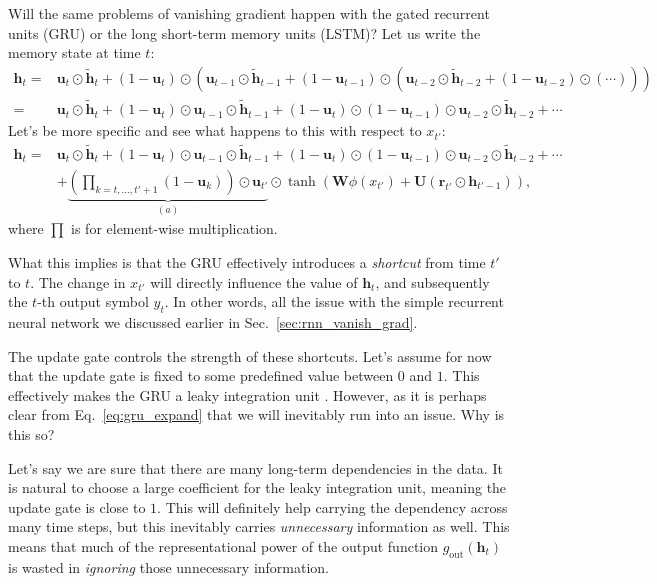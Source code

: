\documentclass{report}
\newcommand{\vect}[1]{\mathbf{#1}}
\newcommand{\matr}[1]{\mathbf{#1}}
\newcommand{\vh}[0]{\vect{h}}
\newcommand{\vu}[0]{\vect{u}}
\newcommand{\vr}[0]{\vect{r}}
\newcommand{\mW}[0]{\matr{W}}
\newcommand{\mU}[0]{\matr{U}}
\begin{document}
Will the same problems of vanishing gradient happen with the gated recurrent
units (GRU) or the long short-term memory units (LSTM)? Let us write the memory 
state at time $t$:
\begin{align*}
    \vh_t =& \vu_t \odot \tilde{\vh}_t + 
    (1 - \vu_t) \odot \left(
        \vu_{t-1} \odot \tilde{\vh}_{t-1} + 
        (1 - \vu_{t-1}) \odot \left(
            \vu_{t-2} \odot \tilde{\vh}_{t-2} + 
            (1 - \vu_{t-2}) \odot \left(
                \cdots
            \right)
        \right)
    \right) 
    \\
    =& \vu_t \odot \tilde{\vh}_t +
    (1-\vu_t) \odot \vu_{t-1} \odot \tilde{\vh}_{t-1} +
    (1-\vu_t) \odot (1-\vu_{t-1}) \odot \vu_{t-2} \odot \tilde{\vh}_{t-2} +
    \cdots
\end{align*}
Let's be more specific and see what happens to this with respect to $x_{t'}$:
\begin{align}
    \vh_t =& \vu_t \odot \tilde{\vh}_t +
    (1-\vu_t) \odot \vu_{t-1} \odot \tilde{\vh}_{t-1} +
    (1-\vu_t) \odot (1-\vu_{t-1}) \odot \vu_{t-2} \odot \tilde{\vh}_{t-2} +
    \cdots 
    \nonumber \\
    \label{eq:gru_expand}
    & +
    \underbrace{
        \left(\prod_{k=t,\ldots,t'+1} (1-\vu_k)\right) \odot \vu_{t'} 
    }_{(a)}
    \odot \tanh \left( \mW \phi(x_{t'}) + \mU \left( \vr_{t'} \odot \vh_{t'-1} \right)
    \right),
\end{align}
where $\prod$ is for element-wise multiplication.

What this implies is that the GRU effectively introduces a {\em shortcut} from
time $t'$ to $t$. The change in $x_{t'}$ will directly influence the value of
$\vh_t$, and subsequently the $t$-th output symbol $y_t$. In other words, all
the issue with the simple recurrent neural network we discussed earlier in
Sec.~\ref{sec:rnn_vanish_grad}.

The update gate controls the strength of these shortcuts. Let's assume for now
that the update gate is fixed to some predefined value between $0$ and $1$. This
effectively makes the GRU a leaky integration unit \cite{bengio2013advances}.
However, as it is perhaps clear from Eq.~\eqref{eq:gru_expand} that we will
inevitably run into an issue. Why is this so? 

Let's say we are sure that there are many long-term dependencies in the data.
It is natural to choose a large coefficient for the leaky integration unit,
meaning the update gate is close to $1$. This will definitely help carrying the
dependency across many time steps, but this inevitably carries {\em unnecessary}
information as well. This means that much of the representational power of the
output function $g_{\text{out}}(\vh_t)$ is wasted in {\em ignoring} those
unnecessary information.
\end{document}
